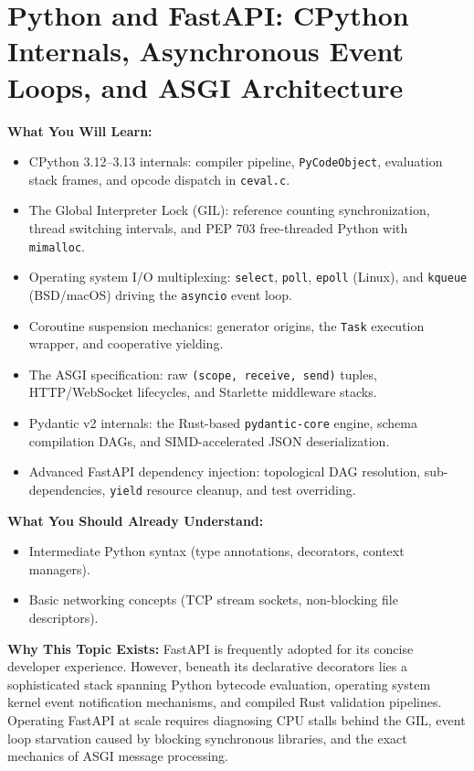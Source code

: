 \chapter{Python and FastAPI: CPython Internals, Asynchronous Event Loops, and ASGI Architecture}
\label{chap:python-fastapi}

\begin{chaptergoalsbox}
\textbf{What You Will Learn:}
\begin{itemize}[leftmargin=12pt,itemsep=2pt]
  \item CPython 3.12--3.13 internals: compiler pipeline, \texttt{PyCodeObject}, evaluation stack frames, and opcode dispatch in \texttt{ceval.c}.
  \item The Global Interpreter Lock (GIL): reference counting synchronization, thread switching intervals, and PEP 703 free-threaded Python with \texttt{mimalloc}.
  \item Operating system I/O multiplexing: \texttt{select}, \texttt{poll}, \texttt{epoll} (Linux), and \texttt{kqueue} (BSD/macOS) driving the \texttt{asyncio} event loop.
  \item Coroutine suspension mechanics: generator origins, the \texttt{Task} execution wrapper, and cooperative yielding.
  \item The ASGI specification: raw \texttt{(scope, receive, send)} tuples, HTTP/WebSocket lifecycles, and Starlette middleware stacks.
  \item Pydantic v2 internals: the Rust-based \texttt{pydantic-core} engine, schema compilation DAGs, and SIMD-accelerated JSON deserialization.
  \item Advanced FastAPI dependency injection: topological DAG resolution, sub-dependencies, \texttt{yield} resource cleanup, and test overriding.
\end{itemize}

\textbf{What You Should Already Understand:}
\begin{itemize}[leftmargin=12pt,itemsep=2pt]
  \item Intermediate Python syntax (type annotations, decorators, context managers).
  \item Basic networking concepts (TCP stream sockets, non-blocking file descriptors).
\end{itemize}

\textbf{Why This Topic Exists:}
FastAPI is frequently adopted for its concise developer experience. However, beneath its declarative decorators lies a sophisticated stack spanning Python bytecode evaluation, operating system kernel event notification mechanisms, and compiled Rust validation pipelines. Operating FastAPI at scale requires diagnosing CPU stalls behind the GIL, event loop starvation caused by blocking synchronous libraries, and the exact mechanics of ASGI message processing.


\end{chaptergoalsbox}
